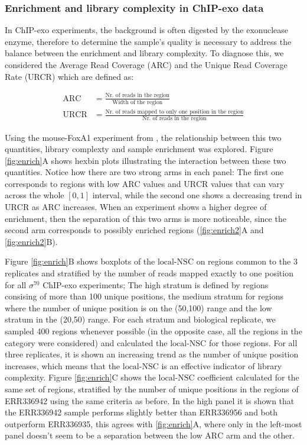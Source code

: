 \documentclass{bmcart}\usepackage[]{graphicx}\usepackage[]{color}
\begin{document}
\subsubsection{Enrichment and library complexity in ChIP-exo data}
\label{sec:enri}

In ChIP-exo experiments, the background is often digested by the
exonuclease enzyme, therefore to determine the sample's quality is
necessary to address the balance between the enrichment and library
complexity. To diagnose this, we considered the Average Read Coverage
(ARC) and the Unique Read Coverage Rate (URCR) which are defined as:

\begin{align}
  \mbox{ARC} &= \frac{\text{Nr. of reads in the region}}{\text{Width of the region}} \nonumber \\
  \mbox{URCR} &= \frac{\text{Nr. of reads mapped to only one position
      in the region}}{\text{Nr. of reads in the region}} \nonumber
\end{align}

Using the mouse-FoxA1 experiment from \cite{exoillumina}, the
relationship between this two quantities, library complexty and sample
enrichment was explored. Figure \ref{fig:enrich}A shows hexbin plots
illustrating the interaction between these two quantities. Notice how
there are two strong arms in each panel: The first one corresponds to
regions with low $\mbox{ARC}$ values and $\mbox{URCR}$ values that can
vary across the whole $[0,1]$ interval, while the second one shows a
decreasing trend in $\mbox{URCR}$ as $\mbox{ARC}$ increases. When an
experiment shows a higher degree of enrichment, then the separation of
this two arms is more noticeable, since the second arm corresponds to
possibly enriched regions (\ref{fig:enrich2}A and \ref{fig:enrich2}B).



Figure \ref{fig:enrich}B shows boxplots of the $\mbox{local-NSC}$ on
regions common to the 3 replicates and stratified by the number of
reads mapped exactly to one position for all $\sigma^{70}$ ChIP-exo
experiments; The high stratum is defined by regions consising of more
than 100 unique positions, the medium stratum for regions
where the number of unique position is on the
(50,100) range and the low stratum in the
(20,50) range. For each stratum and biological
replicate, we sampled 400 regions whenever possible (in
the opposite case, all the regions in the category were considered)
and calculated the $\mbox{local-NSC}$ for those regions. For all three
replicates, it is shown an increasing trend as the number of unique
position increases, which means that the $\mbox{local-NSC}$ is an
effective indicator of library complexity. Figure \ref{fig:enrich}C
shows the $\mbox{local-NSC}$ coefficient calculated for the same set
of regions, stratified by the number of unique positions in the
regions of ERR336942 using the same criteria as before. In the high
panel it is shown that the ERR336942 sample performs slightly better
than ERR336956 and both outperform ERR336935, this agrees with
\ref{fig:enrich}A, where only in the left-most panel doesn't seem to
be a separation between the low $\mbox{ARC}$ arm and the other.
\end{document}
